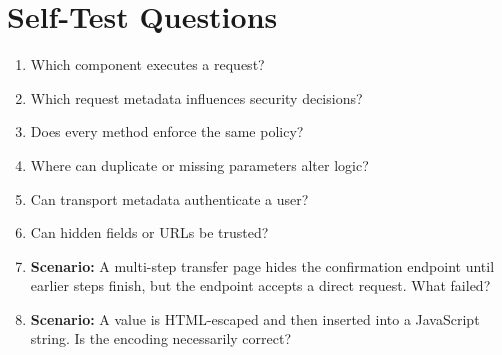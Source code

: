 \documentclass[11pt,letterpaper]{article}
\begin{document}
\section{Self-Test Questions}
\begin{enumerate}
\item Which component executes a request?
\item Which request metadata influences security decisions?
\item Does every method enforce the same policy?
\item Where can duplicate or missing parameters alter logic?
\item Can transport metadata authenticate a user?
\item Can hidden fields or URLs be trusted?
\item \textbf{Scenario:} A multi-step transfer page hides the confirmation endpoint until earlier steps finish, but the endpoint accepts a direct request. What failed?
\item \textbf{Scenario:} A value is HTML-escaped and then inserted into a JavaScript string. Is the encoding necessarily correct?
\end{enumerate}
\clearpage
\end{document}
